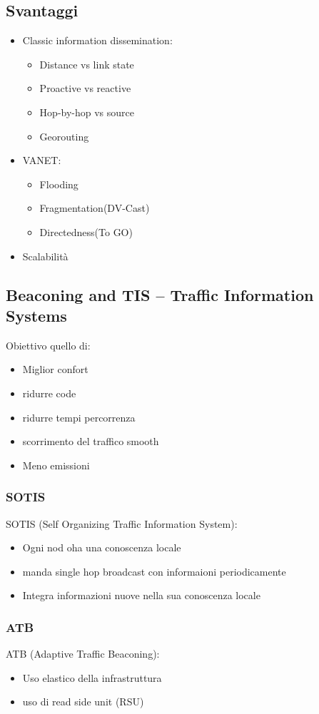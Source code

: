 \subsection{Svantaggi}
\begin{itemize}
	\item Classic information dissemination:
	      \begin{itemize}
		      \item Distance vs link state
		      \item Proactive vs reactive
		      \item Hop-by-hop vs source
		      \item Georouting
	      \end{itemize}
	\item VANET:
	      \begin{itemize}
		      \item Flooding
		      \item Fragmentation(DV-Cast)
		      \item Directedness(To GO)
	      \end{itemize}
	\item Scalabilità
\end{itemize}


\subsection{Beaconing and TIS – Traffic Information Systems}

Obiettivo quello di:
\begin{itemize}
	\item Miglior confort
	\item ridurre code
	\item ridurre tempi percorrenza
	\item scorrimento del traffico smooth
	\item Meno emissioni
\end{itemize}

\subsubsection{SOTIS}
SOTIS (Self Organizing Traffic Information System):
\begin{itemize}
	\item Ogni nod oha una conoscenza locale
	\item manda single hop broadcast con informaioni periodicamente
	\item Integra informazioni nuove nella sua conoscenza locale
\end{itemize}

\subsubsection{ATB}
ATB (Adaptive Traffic Beaconing):
\begin{itemize}
	\item Uso elastico della infrastruttura
	\item uso di read side unit (RSU)
\end{itemize}



